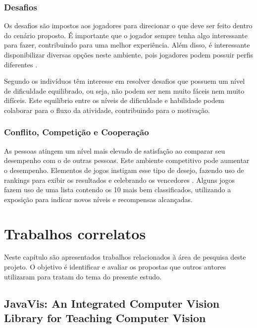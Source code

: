 \documentclass[
	12pt,				%
	oneside,			%
	a4paper,			%
	english,			%
	french,				%
	spanish,			%
	brazil,				%
	]{abntex2}
\begin{document}
\subsection{Desafios}                

Os desafios são impostos aos jogadores para direcionar o que deve ser feito dentro do cenário proposto. É importante que o jogador sempre tenha algo interessante para fazer, contribuindo para uma melhor experiência. Além disso, é interessante disponibilizar diversas opções neste ambiente, pois jogadores podem possuir perfis diferentes \cite{fardo2013gamificaccao}.

Segundo \citet{busarello2016gamificaccao} os indivíduos têm interesse em resolver desafios que possuem um nível de dificuldade equilibrado, ou seja, não podem ser nem muito fáceis nem muito difíceis. Este equilíbrio entre os níveis de dificuldade e habilidade podem colaborar para o fluxo da atividade, contribuindo para o motivação.
    
\subsection{Conflito, Competição e Cooperação}                    

As pessoas atingem um nível mais elevado de satisfação ao comparar seu desempenho com o de outras pessoas. Este ambiente competitivo pode aumentar o desempenho. Elementos de jogos instigam esse tipo de desejo, fazendo uso de rankings para exibir os resultados e celebrando os vencedores  \cite{bunchball2016gamification}. Alguns jogos fazem uso de uma lista contendo os 10 mais bem classificados, utilizando a exposição para indicar novos níveis e recompensas alcançadas.

\chapter{Trabalhos correlatos}

Neste capítulo são apresentados trabalhos relacionados à área de pesquisa deste projeto. O objetivo é identificar e avaliar os propostas que outros autores utilizaram para tratam do tema do presente estudo.

\section{JavaVis: An Integrated Computer Vision Library for Teaching Computer Vision}
\end{document}
